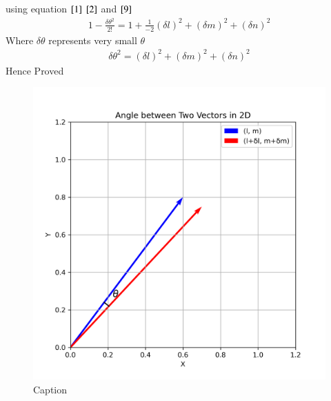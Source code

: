 \documentclass[journal]{IEEEtran}
\begin{document}
using equation $\eqref{1}$ $\eqref{2}$ and $\eqref{9}$
\begin{align}
    1-\frac{\delta\theta^2}{2!}=1+\frac{1}{-2}(\delta l)^2+(\delta m)^2+(\delta n)^2
\end{align}
Where $\delta\theta$ represents very small $\theta$
\begin{align}
\delta\theta^2=(\delta l)^2+(\delta m)^2+(\delta n)^2
\end{align}
Hence Proved
\begin{figure}[H]
    \centering
    \includegraphics[width=\columnwidth]{figs/vectors.png}
    \caption{Caption}
    \label{fig:placeholder}
\end{figure}
\end{document}
